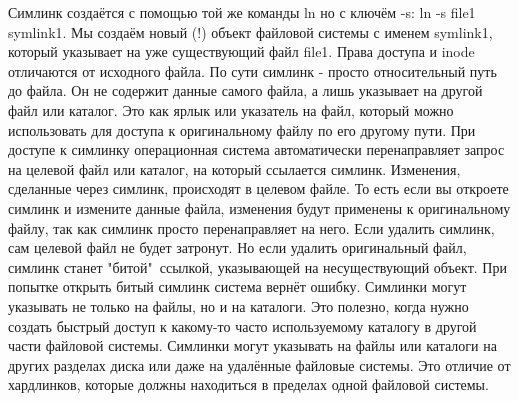 Симлинк создаётся с помощью той же команды ln но с ключём -s: ln -s file1 symlink1. Мы создаём новый (!) объект файловой системы с именем symlink1, который указывает на уже существующий файл file1. Права доступа и inode отличаются от исходного файла. По сути симлинк - просто относительный путь до файла. Он не содержит данные самого файла, а лишь указывает на другой файл или каталог. Это как ярлык или указатель на файл, который можно использовать для доступа к оригинальному файлу по его другому пути. При доступе к симлинку операционная система автоматически перенаправляет запрос на целевой файл или каталог, на который ссылается симлинк. Изменения, сделанные через симлинк, происходят в целевом файле. То есть если вы откроете симлинк и измените данные файла, изменения будут применены к оригинальному файлу, так как симлинк просто перенаправляет на него. Если удалить симлинк, сам целевой файл не будет затронут. Но если удалить оригинальный файл, симлинк станет "битой"\ ссылкой, указывающей на несуществующий объект. При попытке открыть битый симлинк система вернёт ошибку. Симлинки могут указывать не только на файлы, но и на каталоги. Это полезно, когда нужно создать быстрый доступ к какому-то часто используемому каталогу в другой части файловой системы. Симлинки могут указывать на файлы или каталоги на других разделах диска или даже на удалённые файловые системы. Это отличие от хардлинков, которые должны находиться в пределах одной файловой системы.\\
